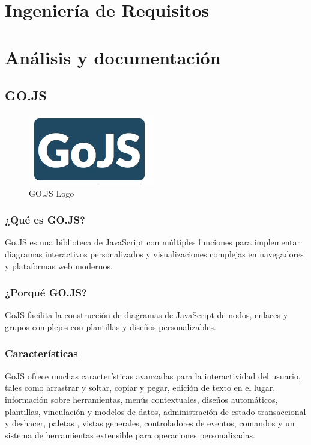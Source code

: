 \documentclass[a4paper,12pt]{article}
\begin{document}
		
		
	 
	  \afterpage{\null\newpage}
	 \newpage
	 
	
	
	\section{Ingeniería de Requisitos}
	
	\afterpage{\null\newpage}
	\newpage
	

	 \section{Análisis y documentación}
	 
	 	\subsection{GO.JS}
	 		
	 		
	 		\begin{figure}[h]
	 			\centering
	 			\includegraphics[scale=1]{gojs.jpeg}
	 			\caption{GO.JS Logo}\label{fig:gojs}
	 		\end{figure}
	 	
	 	
	 		\subsubsection{¿Qué es GO.JS?}
	 			Go.JS \cite{gojs} es una biblioteca de JavaScript con múltiples funciones para implementar diagramas interactivos personalizados y visualizaciones complejas en navegadores y plataformas web modernos.
	 	
	 		\subsubsection{¿Porqué GO.JS?}
	 		 GoJS facilita la construcción de diagramas de JavaScript de nodos, enlaces y grupos complejos con plantillas y diseños personalizables.
	 		
	 		
	 		\subsubsection{Características}
	 		GoJS ofrece muchas características avanzadas para la interactividad del usuario, tales como arrastrar y soltar, copiar y pegar, edición de texto en el lugar, información sobre herramientas, menús contextuales, diseños automáticos, plantillas, vinculación y modelos de datos, administración de estado transaccional y deshacer, paletas , vistas generales, controladores de eventos, comandos y un sistema de herramientas extensible para operaciones personalizadas.
	 		
\end{document}
